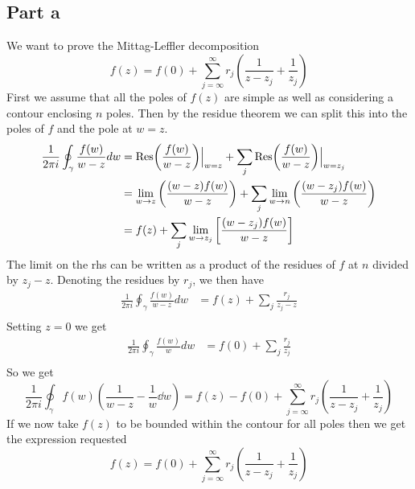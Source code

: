 \documentclass[a4paper,12pt]{article}
\begin{document}
\subsection*{Part a}
We want to prove the Mittag-Leffler decomposition
\begin{equation}
f(z)=f(0)+\sum_{j=\infty}^{\infty }r_j\left(\frac{1}{z-z_j}+\frac{1}{z_j}\right)
\end{equation}
First we assume that all the poles of $f(z)$ are simple as well as considering a contour enclosing $n$ poles. Then by the residue theorem we can split this into the poles of $f$ and the pole at $w=z$.
\begin{equation}
\begin{aligned}
\frac{1}{2\pi i}\oint_\gamma \frac{f(w)}{w-z}dw&=\Res(\frac{f(w)}{w-z})\Big|_{w=z}+\sum_j\Res(\frac{f(w)}{w-z})\Big|_{w=z_j}\\
&=\lim_{w\to z}\left(\frac{(w-z)f(w)}{w-z}\right)+\sum_j\lim_{w\to n}\left(\frac{(w-z_j)f(w)}{w-z}\right)\\
&=f(z)+\sum_j\lim_{w\to z_j}\left[\frac{(w-z_j)f(w)}{w-z}\right]\\
\end{aligned}
\end{equation}
The limit on the rhs can be written as a product of the residues of $f$ at $n$ divided by $z_j-z$. Denoting the residues by $r_j$, we then have
\begin{equation}
\begin{aligned}
\frac{1}{2\pi i}\oint_\gamma \frac{f(w)}{w-z}dw&=f(z)+\sum_j\frac{r_j}{z_j-z}\\
\end{aligned}
\end{equation}
Setting $z=0$ we get
\begin{equation}
	\begin{aligned}
		\frac{1}{2\pi i}\oint_\gamma \frac{f(w)}{w}dw&=f(0)+\sum_j\frac{r_j}{z_j}\\
	\end{aligned}
\end{equation}
So we get
\begin{equation}
\frac{1}{2\pi i}\oint_\gamma f(w)\left(\frac{1}{w-z}-\frac{1}{w}\dd w\right)=f(z)-f(0)+\sum_{j=\infty}^{\infty }r_j\left(\frac{1}{z-z_j}+\frac{1}{z_j}\right)
\end{equation}
If we now take $f(z)$ to be bounded within the contour for all poles then we get the expression requested
\begin{equation}
f(z)=f(0)+\sum_{j=\infty}^{\infty }r_j\left(\frac{1}{z-z_j}+\frac{1}{z_j}\right)
\end{equation}
\end{document}
